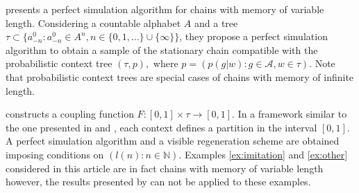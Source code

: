 \documentclass[a4paper]{article}
\newcommand{\N}{\mathbb{N}}
\newcommand{\A}{\mathcal{A}}
\begin{document}





\cite{gallo} presents a perfect simulation algorithm for chains with memory of variable length. Considering a countable alphabet $A$ and a tree $\tau \subset \{a_{-n}^0: a_{-n}^0 \in A^n, n\in \{0,1,\ldots\}\cup\{\infty\}\}$, they propose a perfect simulation algorithm to obtain a sample of the stationary chain compatible with the probabilistic context tree $(\tau,p),$ where $p=(p(g|w):g\in \A, w\in \tau)$. Note that probabilistic context trees are special cases of chains with memory of infinite length. 

\cite{gallo} constructs a coupling function $F:[0,1] \times \tau \to [0,1]$. In a framework similar to the one presented in \cite{cff} and \cite{desantispiccioni},  each context defines a partition in the interval $[0,1]$. A perfect simulation algorithm and a visible regeneration scheme are obtained imposing conditions on $(l(n): n\in \N)$. Examples \ref{ex:imitation} and \ref{ex:other} considered in this article are in fact chains with memory of variable length however, the results presented by \cite{gallo} can not be applied to these examples.

\end{document}
